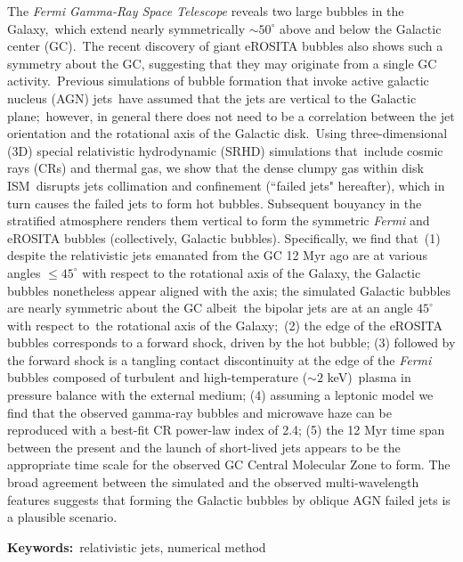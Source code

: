 \begin{abstracten}
The \textit{Fermi Gamma-Ray Space Telescope} reveals two large bubbles in the Galaxy,\
which extend nearly symmetrically $\sim50^{\circ}$ above and below the Galactic center (GC).\
The recent discovery of giant eROSITA bubbles also shows such a symmetry about the GC,
suggesting that they may originate from a single GC activity.\
Previous simulations of bubble formation that invoke active galactic nucleus (AGN) jets\
have assumed that the jets are vertical to the Galactic plane;\
however, in general there does not need to be a correlation between
the jet orientation and the rotational axis of the Galactic disk.\
Using three-dimensional (3D) special relativistic hydrodynamic (SRHD) simulations that\
include cosmic rays (CRs) and thermal gas, we show that the dense clumpy gas within disk ISM\
disrupts jets collimation and confinement (``failed jets" hereafter),
which in turn causes the failed jets to form
hot bubbles. Subsequent bouyancy in the stratified atmosphere renders them vertical to form
the symmetric \textit{Fermi} and eROSITA bubbles (collectively, Galactic bubbles).
Specifically, we find that\
(1) despite the relativistic jets emanated from the GC 12 Myr ago are at various angles
$\leq 45^{\circ}$ with respect to
the rotational axis of the Galaxy, the Galactic bubbles nonetheless appear aligned with the axis;
the simulated Galactic bubbles are nearly symmetric about the GC albeit\
the bipolar jets are at an angle $45^{\circ}$ with respect to\
the rotational axis of the Galaxy;\
(2) the edge of the eROSITA bubbles corresponds to a forward shock, driven by the hot bubble;
(3) followed by the forward shock is a tangling contact discontinuity at the edge of the \textit{Fermi} bubbles
composed of turbulent and high-temperature ($\sim2$ keV)\
plasma in pressure balance with the external medium;
(4) assuming a leptonic model we find that the observed gamma-ray bubbles and microwave haze can be reproduced with
a best-fit CR power-law index of 2.4;
(5) the 12 Myr time span between the present and the launch of short-lived jets appears to be the appropriate time
scale for the observed GC Central Molecular Zone to form.
The broad agreement between the simulated and the
observed multi-wavelength features suggests that forming the Galactic bubbles by
oblique AGN failed jets is a plausible scenario.

\bigbreak
\noindent \textbf{Keywords:}{\, \makeatletter relativistic jets, numerical method \makeatother}
\end{abstracten}

\begin{comment}
\category{I2.10}{Computing Methodologies}{Artificial Intelligence --
Vision and Scene Understanding} \category{H5.3}{Information
Systems}{Information Interfaces and Presentation (HCI) -- Web-based
Interaction.}

\terms{Design, Human factors, Performance.}

\keywords{Region of interest, Visual attention model, Web-based
games, Benchmarks.}
\end{comment}
